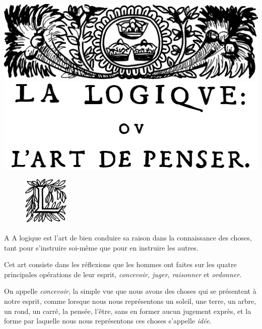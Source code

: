 \section*{}

{\centering
	\includegraphics[scale=0.175]{images/en-tete-la-logique.png}
	\bigbreak
	\includegraphics[scale=0.21]{images/titre-la-logique.png}
	}

\begin{figure}
    \includegraphics[width=0.20\textwidth]{images/enluminure-L0.png}
\end{figure}
\noindent\hspace{13cm}  A {A} logique est l'art de bien conduire sa raison dans la connaissance des choses, tant pour s'instruire soi-même que pour en instruire les autres.

Cet art consiste dans les réflexions que les hommes ont faites sur les quatre principales opérations de leur esprit, \emph{concevoir, juger, raisonner} et \emph{ordonner}.

On appelle \emph{concevoir}, la simple vue que nous avons des choses qui se présentent à notre esprit, comme lorsque nous nous représentons un soleil, une terre, un arbre, un rond, un carré, la pensée, l'être, sans en former aucun jugement exprès, et la forme par laquelle nous nous représentons ces choses s'appelle \emph{idée}.

